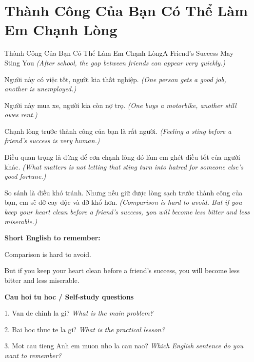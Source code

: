 \section{Thành Công Của Bạn Có Thể Làm Em Chạnh Lòng}
\begin{truyen}{Thành Công Của Bạn Có Thể Làm Em Chạnh Lòng}{A Friend’s Success May Sting You}
\textit{(After school, the gap between friends can appear very quickly.)}

Người này có việc tốt, người kia thất nghiệp.
\textit{(One person gets a good job, another is unemployed.)}

Người này mua xe, người kia còn nợ trọ.
\textit{(One buys a motorbike, another still owes rent.)}

Chạnh lòng trước thành công của bạn là rất người.
\textit{(Feeling a sting before a friend’s success is very human.)}

Điều quan trọng là đừng để cơn chạnh lòng đó làm em ghét điều tốt của người khác.
\textit{(What matters is not letting that sting turn into hatred for someone else’s good fortune.)}

\end{truyen}

\begin{baihoc}
So sánh là điều khó tránh. Nhưng nếu giữ được lòng sạch trước thành công của bạn, em sẽ đỡ cay độc và đỡ khổ hơn.
\textit{(Comparison is hard to avoid. But if you keep your heart clean before a friend’s success, you will become less bitter and less miserable.)}
\end{baihoc}

\begin{ghinhoanh}
\textbf{Short English to remember:}

Comparison is hard to avoid.

But if you keep your heart clean before a friend’s success, you will become less bitter and less miserable.

\end{ghinhoanh}

\begin{tuhocnhanh}
\textbf{Cau hoi tu hoc / Self-study questions}

1. Van de chinh la gi? \textit{What is the main problem?}

2. Bai hoc thuc te la gi? \textit{What is the practical lesson?}

3. Mot cau tieng Anh em muon nho la cau nao? \textit{Which English sentence do you want to remember?}
\end{tuhocnhanh}
\ngancach


